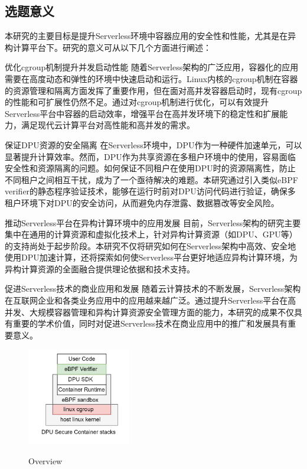 \subsection{选题意义}
本研究的主要目标是提升Serverless环境中容器应用的安全性和性能，尤其是在异构计算平台下。研究的意义可从以下几个方面进行阐述：

优化cgroup机制提升并发启动性能
随着Serverless架构的广泛应用，容器化的应用需要在高度动态和弹性的环境中快速启动和运行。Linux内核的cgroup机制在容器的资源管理和隔离方面发挥了重要作用，但在面对高并发容器启动时，现有cgroup的性能和可扩展性仍然不足。通过对cgroup机制进行优化，可以有效提升Serverless平台中容器的启动效率，增强平台在高并发环境下的稳定性和扩展能力，满足现代云计算平台对高性能和高并发的需求。

保证DPU资源的安全隔离
在Serverless环境中，DPU作为一种硬件加速单元，可以显著提升计算效率。然而，DPU作为共享资源在多租户环境中的使用，容易面临安全性和资源隔离的问题。如何保证不同租户在使用DPU时的资源隔离性，防止不同租户之间相互干扰，成为了一个亟待解决的难题。本研究通过引入类似eBPF verifier的静态程序验证技术，能够在运行时前对DPU访问代码进行验证，确保多租户环境下对DPU的安全访问，从而避免内存泄露、数据篡改等安全风险。

推动Serverless平台在异构计算环境中的应用发展
目前，Serverless架构的研究主要集中在通用的计算资源和虚拟化技术上，针对异构计算资源（如DPU、GPU等）的支持尚处于起步阶段。本研究不仅将研究如何在Serverless架构中高效、安全地使用DPU加速计算，还将探索如何使Serverless平台更好地适应异构计算环境，为异构计算资源的全面融合提供理论依据和技术支持。

促进Serverless技术的商业应用和发展
随着云计算技术的不断发展，Serverless架构在互联网企业和各类业务应用中的应用越来越广泛。通过提升Serverless平台在高并发、大规模容器管理和异构计算资源安全管理方面的能力，本研究的成果不仅具有重要的学术价值，同时对促进Serverless技术在商业应用中的推广和发展具有重要意义。

\captionsetup[figure]{justification=justified}
\begin{figure}
	\centering
		\includegraphics[width=0.4\textwidth]{figures/figure0}
 \label{fig:Overview-1}
 \caption{Overview}
\end{figure}


